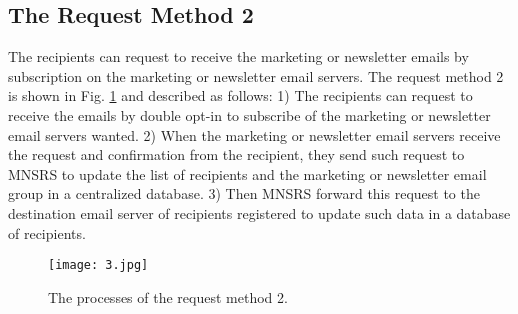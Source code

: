 \documentclass[conference]{IEEEtran}
\begin{document}
\subsection{The Request Method 2}
The recipients can request to receive the marketing or newsletter emails by subscription on the marketing or newsletter email servers.
The request method 2 is
shown in Fig. \ref{fig:Method2Process} and described as follows:
1) The recipients can request to receive the emails by double opt-in \cite{Allman:DoubleOptIn} to subscribe of the marketing or newsletter email servers wanted.
2) When the marketing or newsletter email servers receive the request and confirmation from the recipient, they send such request to MNSRS to update the list of recipients and the marketing or newsletter email group in a centralized database. 
3) Then MNSRS forward this request to the destination email server of recipients registered to update such data in a database of recipients. 

\begin{figure}
\centering
\texttt{[image: 3.jpg]}
\caption{The processes of the request method 2.}
\label{fig:Method2Process}
\end{figure}
\end{document}

